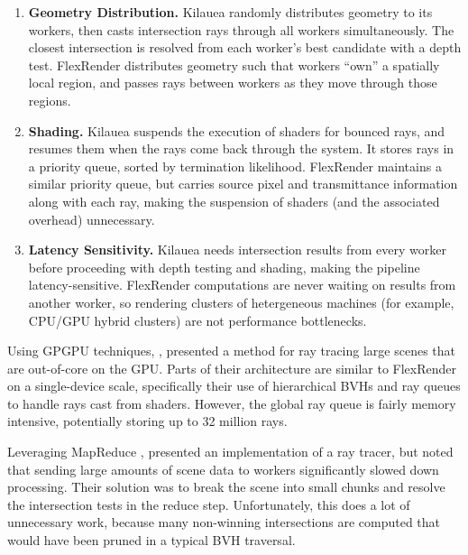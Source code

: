 \documentclass[a4paper,twoside]{article}
\begin{document}
\begin{enumerate}
    \item \textbf{Geometry Distribution.}
        Kilauea randomly distributes geometry to its workers, then casts
        intersection rays through all workers simultaneously. The closest
        intersection is resolved from each worker's best candidate with a
        depth test. FlexRender distributes geometry such that workers ``own''
        a spatially local region, and passes rays between workers as they move
        through those regions.

    \item \textbf{Shading.}
        Kilauea suspends the execution of shaders for bounced rays, and resumes
        them when the rays come back through the system. It stores rays in a
        priority queue, sorted by termination likelihood. FlexRender maintains
        a similar priority queue, but carries source pixel and transmittance
        information along with each ray, making the suspension of shaders (and
        the associated overhead) unnecessary.

    \item \textbf{Latency Sensitivity.}
        Kilauea needs intersection results from every worker before proceeding
        with depth testing and shading, making the pipeline latency-sensitive.
        FlexRender computations are never waiting on results from another worker,
        so rendering clusters of hetergeneous machines (for example, CPU/GPU
        hybrid clusters) are not performance bottlenecks.
\end{enumerate}

Using GPGPU techniques, \cite{garanzha:2011:ray}, presented a
method for ray tracing large scenes that are out-of-core on the GPU. Parts of
their architecture are similar to FlexRender on a single-device scale,
specifically their use of hierarchical BVHs and ray queues to handle rays cast
from shaders. However, the global ray queue is fairly memory intensive,
potentially storing up to 32 million rays.

Leveraging MapReduce \cite{dean:2004}, \cite{northam:2011} presented an
implementation of a ray tracer, but noted that sending large amounts of scene
data to workers significantly slowed down processing. Their solution was to
break the scene into small chunks and resolve the intersection tests in the
reduce step. Unfortunately, this does a lot of unnecessary work, because many
non-winning intersections are computed that would have been pruned in a typical
BVH traversal.
\end{document}
